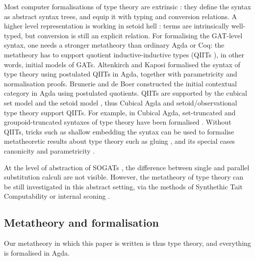 \documentclass[sigplan,10pt,anonymous,review]{acmart}\settopmatter{printfolios=true,printccs=false,printacmref=false}
\begin{document}
Most computer formalisations of type theory are extrinsic
\cite{DBLP:journals/pacmpl/0001OV18,DBLP:conf/cpp/AdjedjLMPP24,DBLP:journals/jar/SozeauABCFKMTW20}:
they define the syntax as abstract syntax trees, and equip it with
typing and conversion relations. A higher level representation is
working in setoid hell \cite{chapman09eatitself}: terms are
intrinsically well-typed, but conversion is still an explicit
relation. For formalising the GAT-level syntax, one needs a stronger
metatheory than ordinary Agda or Coq: the metatheory has to support
quotient inductive-inductive types (QIITs
\cite{DBLP:journals/pacmpl/KaposiKA19}), in other words, initial
models of GATs. Altenkirch and Kaposi
\cite{DBLP:conf/popl/AltenkirchK16} formalised the syntax of type
theory using postulated QIITs in Agda, together with parametricity and
normalisation \cite{lmcs:4005} proofs. Brunerie and de Boer
\cite{initiality-agda} constructed the initial contextual category in
Agda using postulated quotients. QIITs are supported by the cubical
set model \cite{DBLP:conf/lics/CoquandHM18} and the setoid model
\cite{kaposi-qiit-setoid}, thus Cubical Agda
\cite{DBLP:journals/jfp/VezzosiMA21} and setoid/observational type
theory \cite{setoid,DBLP:phd/hal/Pujet22} support QIITs. For example,
in Cubical Agda, set-truncated and groupoid-truncated syntaxes of type
theory have been formalised \cite{cohtt}. Without QIITs, tricks such
as shallow embedding the syntax can be used to formalise metatheoretic
results about type theory such as gluing
\cite{kaposi_et_al:LIPIcs:2019:10532}, and its special cases
canonicity and parametricity \cite{kaposi-shallow}.

At the level of abstraction of SOGATs
\cite{uemura,DBLP:conf/fscd/KaposiX24}, the difference between single
and parallel substitution calculi are not visible. However, the
metatheory of type theory can be still investigated in this abstract
setting, via the methods of Synthethic Tait Computability
\cite{DBLP:phd/us/Sterling22} or internal sconing
\cite{DBLP:conf/fscd/BocquetKS23}.


\subsection{Metatheory and formalisation}

Our metatheory in which this paper is
written is thus type theory, and everything is formalised in Agda.
\end{document}
